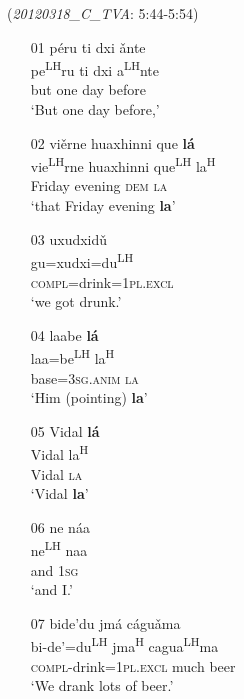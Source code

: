 \ea\label{list} (\textit{20120318{\_}C{\_}TVA}: 5:44-5:54)
\begin{itemize}
\item[01]
\glll p\'{e}ru ti dxi \v{a}nte \\
pe\textsuperscript{LH}ru ti dxi a\textsuperscript{LH}nte \\
but one day before \\
\glt  `But one day before,'


\item[02]
\glll vi\v{e}rne huaxhinni que \textbf{l\'{a}} \\
vie\textsuperscript{LH}rne huaxhinni que\textsuperscript{LH} la\textsuperscript{H} \\
Friday evening \textsc{dem} \textsc{la} \\
\glt  `that Friday evening \textbf{la}'


\item[03]
\glll uxudxid\v{u} \\
gu=xudxi=du\textsuperscript{LH} \\
\textsc{compl}=drink=1\textsc{pl.excl} \\
\glt  `we got drunk.'


\item[04]
\glll laabe \textbf{l\'{a}} \\
laa=be\textsuperscript{LH} la\textsuperscript{H} \\
base=3\textsc{sg.anim} \textsc{la} \\
\glt  `Him (pointing) \textbf{la}'


\item[05]
\glll Vidal \textbf{l\'{a}} \\
Vidal la\textsuperscript{H} \\
Vidal \textsc{la} \\
\glt  `Vidal \textbf{la}'


\item[06]
\glll ne n\'{a}a \\
ne\textsuperscript{LH} naa \\
and 1\textsc{sg} \\
\glt  `and I.'


\item[07]
\glll bide'du jm\'{a} c\'{a}gu\v{a}ma \\
bi-de'=du\textsuperscript{LH} jma\textsuperscript{H} cagua\textsuperscript{LH}ma \\
\textsc{compl}-drink=1\textsc{pl.excl} much beer \\
\glt  `We drank lots of beer.'  

\end{itemize}
\z
\largerpage

